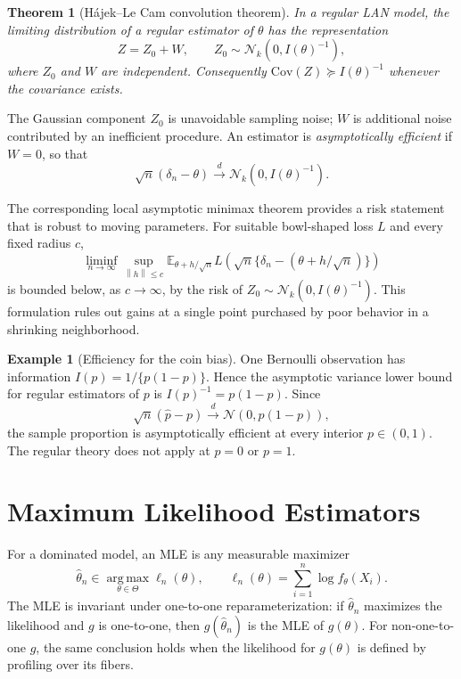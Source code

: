 \documentclass[12pt,oneside]{book}
\numberwithin{equation}{section}
\theoremstyle{definition}
\newtheorem{example}{Example}[section]
\theoremstyle{plain}
\newtheorem{theorem}{Theorem}[section]
\theoremstyle{remark}
\newcommand{\E}{\mathbb{E}}
\newcommand{\Cov}{\mathrm{Cov}}
\newcommand{\convd}{\overset{d}{\to}}
\newcommand{\argmax}{\operatorname*{arg\,max}}
\newcommand{\norm}[1]{\left\lVert #1 \right\rVert}
\newcommand{\Normal}{\mathcal{N}}
\begin{document}
\begin{theorem}[Hájek--Le Cam convolution theorem]
In a regular LAN model, the limiting distribution of a regular estimator of
$\theta$ has the representation
\[
    Z=Z_0+W,
    \qquad
    Z_0\sim\Normal_k(0,I(\theta)^{-1}),
\]
where $Z_0$ and $W$ are independent.  Consequently
$\Cov(Z)\succeq I(\theta)^{-1}$ whenever the covariance exists.
\end{theorem}

The Gaussian component $Z_0$ is unavoidable sampling noise; $W$ is additional
noise contributed by an inefficient procedure.  An estimator is
\emph{asymptotically efficient} if $W=0$, so that
\[
    \sqrt n(\delta_n-\theta)
    \convd\Normal_k(0,I(\theta)^{-1}).
\]

The corresponding local asymptotic minimax theorem provides a risk statement
that is robust to moving parameters.  For suitable bowl-shaped loss $L$ and
every fixed radius $c$,
\[
 \liminf_{n\to\infty}
 \sup_{\norm h\leq c}
 \E_{\theta+h/\sqrt n}
 L\!\left(\sqrt n\{\delta_n-(\theta+h/\sqrt n)\}\right)
\]
is bounded below, as $c\to\infty$, by the risk of
$Z_0\sim\Normal_k(0,I(\theta)^{-1})$.  This formulation rules out gains at a
single point purchased by poor behavior in a shrinking neighborhood.

\begin{example}[Efficiency for the coin bias]
One Bernoulli observation has information $I(p)=1/\{p(1-p)\}$.  Hence the
asymptotic variance lower bound for regular estimators of $p$ is
$I(p)^{-1}=p(1-p)$.  Since
\[
    \sqrt n(\widehat p-p)\convd\Normal(0,p(1-p)),
\]
the sample proportion is asymptotically efficient at every interior
$p\in(0,1)$.  The regular theory does not apply at $p=0$ or $p=1$.
\end{example}

\section{Maximum Likelihood Estimators}

For a dominated model, an MLE is any measurable maximizer
\[
    \widehat\theta_n\in\argmax_{\theta\in\Theta}
       \ell_n(\theta),
    \qquad
    \ell_n(\theta)=\sum_{i=1}^n\log f_\theta(X_i).
\]
The MLE is invariant under one-to-one reparameterization: if
$\widehat\theta_n$ maximizes the likelihood and $g$ is one-to-one, then
$g(\widehat\theta_n)$ is the MLE of $g(\theta)$.  For non-one-to-one $g$, the
same conclusion holds when the likelihood for $g(\theta)$ is defined by
profiling over its fibers.
\end{document}
